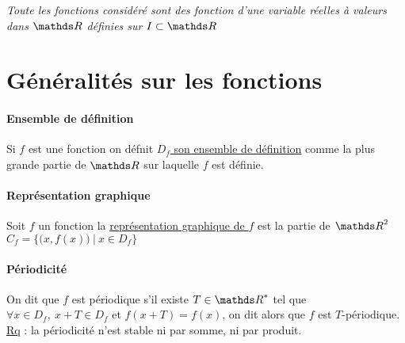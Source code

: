 

\textit{Toute les fonctions considéré sont des fonction d'une variable réelles à valeurs dans $\R$ définies sur $I\subset \R$}
\minitoc
	\section{Généralités sur les fonctions}
		\traitd
		\paragraph{Ensemble de définition}
			Si $f$ est une fonction on défnit \underline{$D_f$ son ensemble de définition} comme la plus grande partie de $\R$ sur laquelle $f$ est 
			définie. \trait ${}$ \vspace*{-1.4cm} \traitd
		\paragraph{Représentation graphique}
			Soit $f$ un fonction la \underline{représentation graphique de $f$} est la partie de $\R^2$ $C_f = \{\big(x,f(x)\big) ~|~
			x\in D_f \}$ \trait
		 \traitd
		\paragraph{Périodicité}
			On dit que $f$ est périodique s'il existe $T\in\R^*$ tel que $\forall x\in D_f,~ x+T\in D_f$ et $f(x+T)=f(x)$, on dit alors que $f$ est 
			$T$-périodique. \trait
		\vspace*{-1.1cm} \\ \underline{Rq} : la périodicité n'est stable ni par somme, ni par produit.
		\vspace*{0.5cm} \\  \traitd
